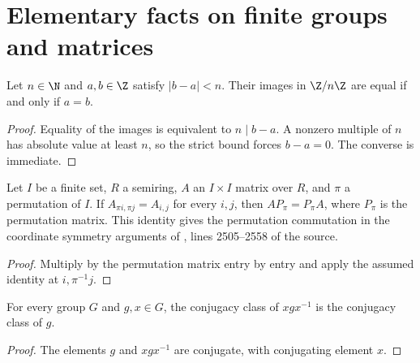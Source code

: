 \section{Elementary facts on finite groups and matrices}
\label{sec:characters_elementary}

\begin{lemma}%
    \label{thm:peps_zmod_small_difference}
    \leanok
    Let $n\in\N$ and $a,b\in\Z$ satisfy $|b-a|<n$.
    Their images in $\Z/n\Z$ are equal if and only if $a=b$.
\end{lemma}

\begin{proof}\leanok
    Equality of the images is equivalent to $n\mid b-a$.
    A nonzero multiple of $n$ has absolute value at least $n$,
    so the strict bound forces $b-a=0$. The converse is immediate.
\end{proof}

\begin{lemma}
    \label{lem:peps_permutation_matrix_commutation}
    \leanok
    Let $I$ be a finite set, $R$ a semiring, $A$ an $I\times I$ matrix
    over $R$, and $\pi$ a permutation of $I$. If
    $A_{\pi i,\pi j}=A_{i,j}$ for every $i,j$, then
    $AP_\pi=P_\pi A$, where $P_\pi$ is the permutation matrix.
    This identity gives the permutation commutation in the
    coordinate symmetry arguments of \cite{Schuch2010PEPS}, lines
    2505--2558 of the source.
\end{lemma}

\begin{proof}\leanok
    Multiply by the permutation matrix entry by entry and apply the
    assumed identity at $i,\pi^{-1}j$.
\end{proof}

\begin{lemma}%
    \label{thm:peps_conjugacy_class_invariance}
    \leanok
    For every group $G$ and $g,x\in G$, the conjugacy class of $xgx^{-1}$
    is the conjugacy class of $g$.
\end{lemma}

\begin{proof}\leanok
    The elements $g$ and $xgx^{-1}$ are conjugate, with conjugating element $x$.
\end{proof}

